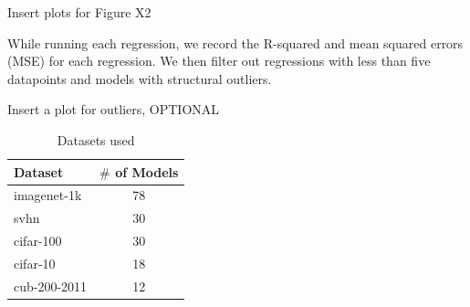 
Insert plots for Figure X2

While running each regression, we record the R-squared and mean squared errors (MSE) for each regression. We then filter out regressions with less than five datapoints and models with structural outliers.



Insert a plot for outliers, OPTIONAL


\begin{table}[t]
\small
\begin{center}
\begin{tabular}{|p{1in}|c|}
\hline
Dataset & $\#$ of Models \\
\hline
imagenet-1k   &  78 \\
svhn          &  30 \\
cifar-100     &  30 \\
cifar-10      &  18 \\
cub-200-2011  &  12 \\
\hline
\end{tabular}
\end{center}
\caption{Datasets used}
\label{table:datasets}
\end{table}




